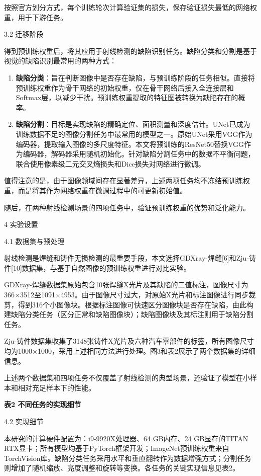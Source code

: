 按照官方划分方式，每个训练轮次计算验证集的损失，保存验证损失最低的网络权重，用于下游任务。

3.2 迁移阶段

得到预训练权重后，将其应用于射线检测的缺陷识别任务。缺陷分类和分割是基于视觉的缺陷识别最常用的两种方式：

\begin{enumerate}
	\def\labelenumi{\arabic{enumi}.}
	\item
	\textbf{缺陷分类}：旨在判断图像中是否存在缺陷，与预训练阶段的任务相似。直接将预训练权重作为骨干网络的初始权重，仅在骨干网络后接入全连接层和Softmax层，以减少干扰。预训练权重提取的特征图被转换为缺陷存在的概率。
	\item
	\textbf{缺陷分割}：目标是实现缺陷的精确定位、面积测量和深度估计。UNet已成为训练数据不足的图像分割任务中最常用的模型之一。原始UNet采用VGG作为编码器，提取输入图像的多尺度特征。本文将预训练的ResNet50替换VGG作为编码器，解码器采用随机初始化。针对缺陷分割任务中的数据不平衡问题，联合使用像素级二元交叉熵损失和Dice损失对网络进行微调。
\end{enumerate}

值得注意的是，由于图像领域间存在显著差异，上述两项任务均不冻结预训练权重，而是将其作为网络权重在微调过程中的可更新初始值。

随后，在两种射线检测场景的四项任务中，验证预训练权重的优势和泛化能力。

4 实验设置

4.1	数据集与预处理

射线检测是焊缝和铸件无损检测的最重要手段，本文选择GDXray-焊缝{[}6{]}和Zju-铸件{[}10{]}数据集，与基于自然图像的预训练权重进行对比实验。

GDXray-焊缝数据集原始包含10张焊缝X光片及其缺陷的二值标注，图像尺寸为366×3512至1091×4953。由于图像尺寸过大，对原始X光片和标注图像进行同步裁剪，得到316个小图像块。根据标注图像可快速区分图像块是否存在缺陷，由此构建缺陷分类任务（区分正常和缺陷图像块）；缺陷图像块及其标注则用于缺陷分割任务。

Zju-铸件数据集收集了3148张铸件X光片及六种汽车零部件的标签，所有图像尺寸均为1000×1000，采用上述相同方法进行处理。图3和表2展示了两个数据集的详细信息。

上述两个数据集和四项任务不仅覆盖了射线检测的典型场景，还验证了模型在小样本和相对充足样本下的性能。

\textbf{表2 不同任务的实现细节}

4.2 实现细节

本研究的计算硬件配置为：i9-9920X处理器、64 GB内存、24 GB显存的TITAN
RTX显卡；所有模型均基于PyTorch框架开发；ImageNet预训练权重来自TorchVision库。缺陷分类任务采用水平和垂直翻转作为数据增强方式；分割任务则增加了随机缩放、亮度调整和旋转等变换。各任务的关键实现信息见表2。


